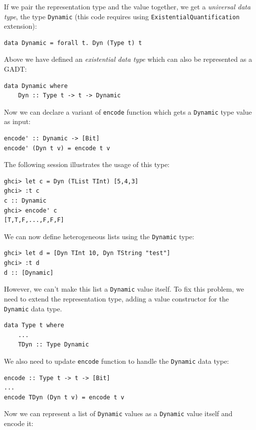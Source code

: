 \documentclass{tmr}
\newcommand{\italic}[1]{\textit{#1}}
\begin{document}
If we pair the representation type and the value together, we get a \italic{universal data type}, the type \verb|Dynamic| (this code requires using \verb|ExistentialQuantification| extension):

\begin{Verbatim}
data Dynamic = forall t. Dyn (Type t) t
\end{Verbatim}

Above we have defined an \italic{existential data type} which can also be represented as a GADT:

\begin{Verbatim}
data Dynamic where
    Dyn :: Type t -> t -> Dynamic
\end{Verbatim}

Now we can declare a variant of \verb|encode| function which gets a \verb|Dynamic| type value as input:

\begin{Verbatim}
encode' :: Dynamic -> [Bit]
encode' (Dyn t v) = encode t v
\end{Verbatim}

The following session illustrates the usage of this type:

\begin{Verbatim}
ghci> let c = Dyn (TList TInt) [5,4,3]
ghci> :t c
c :: Dynamic
ghci> encode' c
[T,T,F,...,F,F,F]
\end{Verbatim}

We can now define heterogeneous lists using the \verb|Dynamic| type:

\begin{Verbatim}
ghci> let d = [Dyn TInt 10, Dyn TString "test"]
ghci> :t d
d :: [Dynamic]
\end{Verbatim}

However, we can't make this list a \verb|Dynamic| value itself. To fix this problem, we need to extend the representation type, adding a value constructor for the \verb|Dynamic| data type.

\begin{Verbatim}
data Type t where
    ...
    TDyn :: Type Dynamic
\end{Verbatim}

We also need to update \verb|encode| function to handle the \verb|Dynamic| data type:

\begin{Verbatim}
encode :: Type t -> t -> [Bit]
...
encode TDyn (Dyn t v) = encode t v
\end{Verbatim}

Now we can represent a list of \verb|Dynamic| values as a \verb|Dynamic| value itself and encode it:
\end{document}
